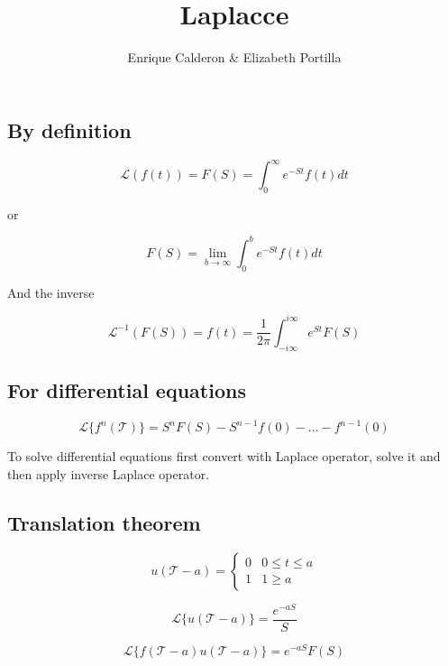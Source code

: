 \documentclass[letterpaper]{article}
\title{Laplacce}
\author{Enrique Calderon \& Elizabeth Portilla}
\newcommand{\divline}{\noindent\makebox[\linewidth]{\rule{\textwidth}{0.4pt}}}
\begin{document}
    \maketitle

    \divline

    \begin{multicols}{2}

        \section{By definition}

            \[\mathcal{L} (f(t)) = F(S) = \int_{0}^{\infty} e^{-St} f(t) dt \]

            or 

            \[F(S) = \lim_{b \to \infty } \int_{0}^{b} e^{-St} f(t) dt \]

            And the inverse

            \[\mathcal{L}^{-1} (F(S)) = f(t) = \frac{1}{2\pi} \int_{-i\infty}^{i\infty} e^{St}F(S) \]
            
    \end{multicols}

    \divline

    \begin{multicols}{2}
        \section{For differential equations}

            \[\mathcal{L} \{ f^{n} (\mathcal{T}) \} = S^{n} F(S) - S^{n-1} f(0) - ... - f^{n-1} (0) \]

            To solve differential equations first convert with Laplace operator, solve it and then apply inverse Laplace operator.

    
    \end{multicols}

    \divline

    \begin{multicols}{2}
        \section{Translation theorem}
            			
		\[u(\mathcal{T}-a) = 
			\begin{cases} 
				0  & 0 \leq t \leq a \\
				1 & 1 \geq a
			\end{cases}
		\]

             \[\mathcal{L} \{ u(\mathcal{T} - a) \} = \frac{e^{-aS}}{S} \]
             
             \[\mathcal{L} \{ f(\mathcal{T} - a) u(\mathcal{T} - a) \} = e^{-aS} F(S) \]

    \end{multicols}
\end{document}
